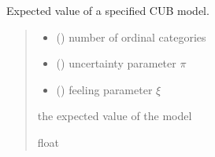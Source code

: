 \documentclass[letterpaper,10pt,english]{sphinxmanual}
\begin{document}
\begin{fulllineitems}
\label{\detokenize{cubmods:cubmods.cub.mean}}
\pysigstartsignatures
{}
\pysigstopsignatures
\sphinxAtStartPar
Expected value of a specified CUB model.
\begin{quote}\begin{description}
\begin{itemize}
\item {} 
\sphinxAtStartPar
{} () \textendash{} number of ordinal categories

\item {} 
\sphinxAtStartPar
{} () \textendash{} uncertainty parameter \(\pi\)

\item {} 
\sphinxAtStartPar
{} () \textendash{} feeling parameter \(\xi\)

\end{itemize}

\sphinxAtStartPar
the expected value of the model

\sphinxAtStartPar
float

\end{description}\end{quote}

\end{fulllineitems}

\end{document}
